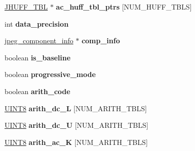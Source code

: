 \begin{DoxyCompactItemize}
\hyperlink{struct_j_h_u_f_f___t_b_l}{J\+H\+U\+F\+F\+\_\+\+T\+BL} $\ast$ {\bfseries ac\+\_\+huff\+\_\+tbl\+\_\+ptrs} \mbox{[}N\+U\+M\+\_\+\+H\+U\+F\+F\+\_\+\+T\+B\+LS\mbox{]}
\item 
\mbox{\label{structjpeg__decompress__struct_ad55d8fc56faa42d05d1a80ad84ce3e9c}} 
int {\bfseries data\+\_\+precision}
\item 
\mbox{\label{structjpeg__decompress__struct_afb7ab593b5699842965eccb64e6e200a}} 
\hyperlink{structjpeg__component__info}{jpeg\+\_\+component\+\_\+info} $\ast$ {\bfseries comp\+\_\+info}
\item 
\mbox{\label{structjpeg__decompress__struct_a7ba5fd9c43f0bd3161f1fc618aa39e37}} 
boolean {\bfseries is\+\_\+baseline}
\item 
\mbox{\label{structjpeg__decompress__struct_a6e2f9fd1cba287dc632070f3c8390d1c}} 
boolean {\bfseries progressive\+\_\+mode}
\item 
\mbox{\label{structjpeg__decompress__struct_aa59d02c7dfa58e22321c1f5fa154b151}} 
boolean {\bfseries arith\+\_\+code}
\item 
\mbox{\label{structjpeg__decompress__struct_a746b5ecfe0401a1ffe423191d4b929b0}} 
\hyperlink{_processor_bind_8h_ab27e9918b538ce9d8ca692479b375b6a}{U\+I\+N\+T8} {\bfseries arith\+\_\+dc\+\_\+L} \mbox{[}N\+U\+M\+\_\+\+A\+R\+I\+T\+H\+\_\+\+T\+B\+LS\mbox{]}
\item 
\mbox{\label{structjpeg__decompress__struct_af181cece11c6bb960cb97f648f0e67aa}} 
\hyperlink{_processor_bind_8h_ab27e9918b538ce9d8ca692479b375b6a}{U\+I\+N\+T8} {\bfseries arith\+\_\+dc\+\_\+U} \mbox{[}N\+U\+M\+\_\+\+A\+R\+I\+T\+H\+\_\+\+T\+B\+LS\mbox{]}
\item 
\mbox{\label{structjpeg__decompress__struct_a9c54eeff8fd2af185c34be22e5c21420}} 
\hyperlink{_processor_bind_8h_ab27e9918b538ce9d8ca692479b375b6a}{U\+I\+N\+T8} {\bfseries arith\+\_\+ac\+\_\+K} \mbox{[}N\+U\+M\+\_\+\+A\+R\+I\+T\+H\+\_\+\+T\+B\+LS\mbox{]}
\item 

\end{DoxyCompactItemize}
